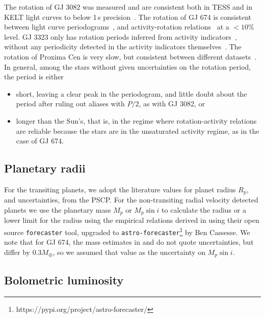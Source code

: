\documentclass[twocolumn]{aastex631}
\begin{document}
The rotation of GJ 3082 was measured and are consistent both in TESS and in KELT light curves to below 1\,s precision~\citep{gunther2020stellar}. The rotation of GJ 674 is consistent between light curve periodograms~\citep{kiraga2007agerotationactivity}, and activity-rotation relations~\citep{boisse2011disentangling} at a $<10\%$ level. GJ 3323 only has rotation periods inferred from activity indicators~\citep{astudillo-defru2017magnetic}, without any periodicity detected in the activity indicators themselves~\citep{astudillo-defru2017harps}. The rotation of Proxima Cen is very slow, but consistent between different datasets~\citep{anglada-escude2016terrestrial, kiraga2007agerotationactivity}. In general, among the stars without given uncertainties on the rotation period, the period is either 
\begin{itemize}
    \item short, leaving a clear peak in the periodogram, and little doubt about the period after ruling out aliases with $P/2$, as with GJ 3082, or
    \item longer than the Sun's, that is, in the regime where rotation-activity relations are reliable because the stars are in the unsaturated activity regime, as in the case of GJ 674.
\end{itemize} 


\subsection{Planetary radii}
\label{sec:data:planetradii}
For the transiting planets, we adopt the literature values for planet radius $R_p$, and uncertainties, from the PSCP. For the non-transiting radial velocity detected planets we use the planetary mass $M_p$ or $M_p\sin i$ to calculate the radius or a lower limit for the radius using the empirical relations derived in \cite{chen2017probabilistic} using their open source \texttt{forecaster} tool, upgraded to \texttt{astro-forecaster}\footnote{https://pypi.org/project/astro-forecaster/} by Ben Cassesse. We note that for GJ 674, the mass estimates in \cite{bonfils2007harps} and \cite{boisse2011disentangling} do not quote uncertainties, but differ by $0.3M_\oplus$, so we assumed that value as the uncertainty on $M_p\sin i$.

\subsection{Bolometric luminosity}
\label{sec:data:lum}
\end{document}
